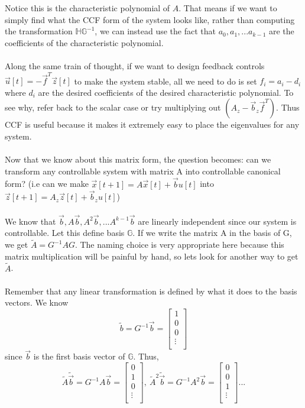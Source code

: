 \documentclass{article}
\begin{document}
Notice this is the characteristic polynomial of $A$. That means if we want to simply find what the CCF form of the system looks like, rather than computing the transformation $\mathbb{H}\mathbb{G}^{-1}$,
we can instead use the fact that $a_0, a_1, ... a_{k-1}$ are the coefficients of the characteristic polynomial.
\\\\Along the same train of thought, if we want to design feedback controls
\\$\vec{u}[t]=-\vec{f}^T\vec{z}[t]$ to make the system stable,
all we need to do is set $f_i = a_i - d_i$ where $d_i$ are the desired coefficients of the desired characteristic polynomial.
To see why, refer back to the scalar case or try multiplying out $(A_z-\vec{b}_z\vec{f}^T)$.
 Thus CCF is useful because it makes it extremely easy to place the eigenvalues for any system.
\\\\Now that we know about this matrix form, the question becomes: can we transform any controllable system with matrix A into controllable canonical form?
(i.e can we make $\vec{x}[t+1]=A\vec{x}[t]+\vec{b}u[t]$ into $\vec{z}[t+1]=A_z\vec{z}[t]+\vec{b}_zu[t]$)
\\\\We know that $\vec{b}, A\vec{b}, A^2\vec{b}, ... A^{k-1}\vec{b}$ are linearly independent since our system is controllable. Let this define basis $\mathbb{G}$. If we write the matrix A in the basis of G, we get $\tilde{A}=G^{-1}AG$.
The naming choice is very appropriate here because this matrix multiplication will be painful by hand, so lets look for another way to get $\tilde{A}$.
\\\\Remember that any linear transformation is defined by what it does to the basis vectors. We know
\[
    \tilde{b} = G^{-1}\vec{b} = \left[
        \begin{array}{c}
            1\\
            0\\
            0\\
            \vdots\\
        \end{array}
    \right]
\]
since $\vec{b}$ is the first basis vector of $\mathbb{G}$. Thus,
\[
    \tilde{A}\tilde{\vec{b}}=G^{-1}A\vec{b} = \left[
        \begin{array}{c}
            0\\
            1\\
            0\\
            \vdots\\
        \end{array}
    \right],\>
    \tilde{A}^2\tilde{\vec{b}} = G^{-1}A^2\vec{b} = \left[
        \begin{array}{c}
            0\\
            0\\
            1\\
            \vdots\\
        \end{array}
    \right] ...
\]
\end{document}
